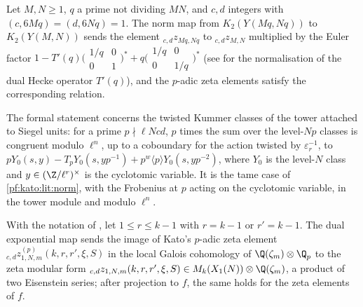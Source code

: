 \begin{littheorem}\label{pf:kato:lit:norm}
Let $M,N\ge1$, $q$ a prime not dividing $MN$, and $c,d$ integers with $(c,6Mq)=(d,6Nq)=1$. The norm map from $K_2(Y(Mq,Nq))$ to
$K_2(Y(M,N))$ sends the element ${}_{c,d}z_{Mq,Nq}$ to ${}_{c,d}z_{M,N}$ multiplied by the Euler factor
$1-T'(q)\bigl(\begin{smallmatrix}1/q&0\\0&1\end{smallmatrix}\bigr)^*+q\bigl(\begin{smallmatrix}1/q&0\\0&1/q\end{smallmatrix}\bigr)^*$
(see \cite[\S2]{Kato2004} for the normalisation of the dual Hecke operator $T'(q)$), and the $p$-adic zeta elements satisfy the
corresponding relation.
\end{littheorem}

\begin{remark}\label{pf:kato:rem:norm}
The formal statement concerns the twisted Kummer classes of the tower attached to Siegel units: for a prime $p\nmid\ell Ncd$, $p$ times the
sum over the level-$Np$ classes is congruent modulo $\ell^n$, up to a coboundary for the action twisted by $\varepsilon_r^{-1}$, to
$pY_0(s,y)-T_pY_0(s,yp^{-1})+p^w\langle p\rangle Y_0(s,yp^{-2})$, where $Y_0$ is the level-$N$ class and $y\in(\Z/\ell^r)^\times$ is the
cyclotomic variable. It is the tame case of \cref{pf:kato:lit:norm}, with the Frobenius at $p$ acting on the cyclotomic variable, in the
tower module and modulo $\ell^n$.
\end{remark}

\begin{littheorem}\label{pf:kato:lit:erl}
With the notation of \cite[8.1]{Kato2004}, let $1\le r\le k-1$ with $r=k-1$ or $r'=k-1$. The dual exponential map sends the image of
Kato's $p$-adic zeta element ${}_{c,d}z^{(p)}_{1,N,m}(k,r,r',\xi,S)$ in the local Galois cohomology of $\Q(\zeta_m)\otimes\Q_p$ to the zeta
modular form ${}_{c,d}z_{1,N,m}(k,r,r',\xi,S)\in M_k(X_1(N))\otimes\Q(\zeta_m)$, a product of two Eisenstein series; after projection
to $f$, the same holds for the zeta elements of $f$.
\end{littheorem}

